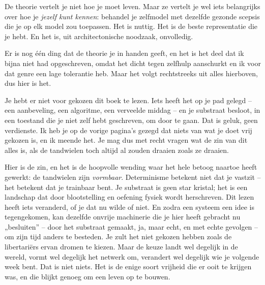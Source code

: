 \documentclass[11pt, twoside, openright]{book}
\begin{document}
De theorie vertelt je niet hoe je moet leven. Maar ze vertelt je wel iets belangrijks over hoe je \textit{jezelf kunt kennen}: behandel je zelfmodel met dezelfde gezonde scepsis die je op elk model zou toepassen. Het is nuttig. Het is de beste representatie die je hebt. En het is, uit architectonische noodzaak, onvolledig.

Er is nog één ding dat de theorie je in handen geeft, en het is het deel dat ik bijna niet had opgeschreven, omdat het dicht tegen zelfhulp aanschurkt en ik voor dat genre een lage tolerantie heb. Maar het volgt rechtstreeks uit alles hierboven, dus hier is het.

Je hebt er niet voor gekozen dit boek te lezen. Iets heeft het op je pad gelegd -- een aanbeveling, een algoritme, een verveelde middag -- en je substraat besloot, in een toestand die je niet zelf hebt geschreven, om door te gaan. Dat is geluk, geen verdienste. Ik heb je op de vorige pagina's gezegd dat niets van wat je doet vrij gekozen is, en ik meende het. Je mag dus met recht vragen wat de zin van dit alles is, als de tandwielen toch altijd al zouden draaien zoals ze draaien.

Hier is de zin, en het is de hoopvolle wending waar het hele betoog naartoe heeft gewerkt: de tandwielen zijn \textit{vormbaar}. Determinisme betekent niet dat je vastzit -- het betekent dat je trainbaar bent. Je substraat is geen star kristal; het is een landschap dat door blootstelling en oefening fysiek wordt herschreven. Dit lezen heeft iets veranderd, of je dat nu wilde of niet. En zodra een systeem een idee is tegengekomen, kan dezelfde onvrije machinerie die je hier heeft gebracht nu „besluiten” -- door het substraat gemaakt, ja, maar echt, en met echte gevolgen -- om zijn tijd anders te besteden. Je zult het niet gekozen hebben zoals de libertariërs ervan dromen te kiezen. Maar de keuze landt wel degelijk in de wereld, vormt wel degelijk het netwerk om, verandert wel degelijk wie je volgende week bent. Dat is niet niets. Het is de enige soort vrijheid die er ooit te krijgen was, en die blijkt genoeg om een leven op te bouwen.
\end{document}
